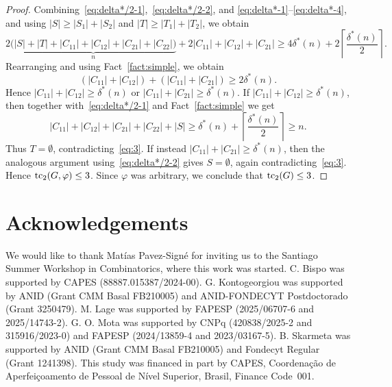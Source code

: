 \documentclass[12pt,reqno,a4paper]{amsart}
\def\tc{\mathop{\text{\rm tc}}\nolimits}
\begin{document}
\begin{proof}
Combining~\eqref{eq:delta*/2-1},~\eqref{eq:delta*/2-2}, and
\eqref{eq:delta*-1}--\eqref{eq:delta*-4}, and using
$|S|\ge|S_1|+|S_2|$ and $|T|\ge|T_1|+|T_2|$, we obtain
\begin{equation*}
2\underbrace{\bigl(|S|+|T|+|C_{11}|+|C_{12}|+|C_{21}|+|C_{22}|\bigr)}_{n}
+2|C_{11}|+|C_{12}|+|C_{21}|
\ge 4\delta^*(n)+2\left\lceil\frac{\delta^*(n)}{2}\right\rceil.
\end{equation*}
Rearranging and using Fact~\ref{fact:simple}, we obtain
\begin{equation*}
(|C_{11}| + |C_{12}|) + (|C_{11}| + |C_{21}|) \ge 2\delta^*(n).
\end{equation*}
Hence $|C_{11}| + |C_{12}| \ge \delta^*(n)$ or $|C_{11}| + |C_{21}| \ge
\delta^*(n)$. If $|C_{11}| + |C_{12}| \ge \delta^*(n)$, then together
with~\eqref{eq:delta*/2-1} and Fact~\ref{fact:simple} we get
\begin{equation*}
|C_{11}| + |C_{12}| + |C_{21}| + |C_{22}| + |S| \ge \delta^*(n) + \left\lceil \frac{\delta^*(n)}{2} \right\rceil \ge n.
\end{equation*}
Thus $T=\emptyset$, contradicting~\eqref{eq:3}. If instead
$|C_{11}|+|C_{21}|\ge \delta^*(n)$, then the analogous argument
using~\eqref{eq:delta*/2-2}
gives $S=\emptyset$, again contradicting~\eqref{eq:3}. Hence
$\tc_2(G,\varphi) \le 3$. Since $\varphi$ was arbitrary, we conclude that
$\tc_2(G) \le 3$.
\end{proof}

\section*{Acknowledgements}
We would like to thank Matías Pavez-Signé for inviting us to the Santiago Summer
Workshop in Combinatorics, where this work was started. C. Bispo was supported
by CAPES (88887.015387/2024-00). G. Kontogeorgiou was supported by ANID (Grant
CMM Basal FB210005) and ANID-FONDECYT Postdoctorado (Grant 3250479). M. Lage was
supported by FAPESP (2025/06707-6 and 2025/14743-2). G. O. Mota was supported by
CNPq (420838/2025-2 and 315916/2023-0) and FAPESP (2024/13859-4 and
2023/03167-5). B. Skarmeta was supported by ANID (Grant CMM Basal FB210005) and Fondecyt Regular (Grant 1241398). This study was financed in
part by CAPES, Coordenação de Aperfeiçoamento de Pessoal de Nível Superior,
Brasil, Finance Code~001.



\end{document}
